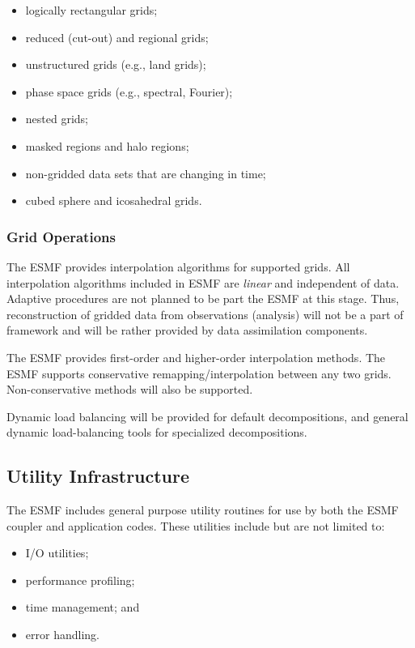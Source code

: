 \begin{itemize}
\item logically rectangular grids;
\item reduced (cut-out) and regional grids;
\item unstructured grids (e.g., land grids);
\item phase space grids (e.g., spectral, Fourier);
\item nested grids;
\item masked regions and halo regions;
\item non-gridded data sets that are changing in time;
\item cubed sphere and icosahedral grids.
\end{itemize}

\subsubsection{Grid Operations}

The ESMF provides interpolation algorithms for supported grids.
All interpolation algorithms included in ESMF are {\it linear} 
and independent of data. Adaptive procedures are not planned to be 
part the ESMF at this stage. Thus, reconstruction of gridded data from 
observations (analysis) will not be a part of framework and will be 
rather provided by data assimilation components.

The ESMF provides first-order and higher-order interpolation 
methods.  The ESMF supports conservative remapping/interpolation 
between any two grids. Non-conservative methods will also 
be supported.

Dynamic load balancing will be provided for default decompositions, 
and general dynamic load-balancing tools for specialized decompositions.

\subsection{Utility Infrastructure}

The ESMF includes general purpose utility routines for use by both 
the ESMF coupler and application codes.  These utilities include 
but are not limited to:
\begin{itemize}
\item I/O utilities;
\item performance profiling;
\item time management; and
\item error handling.
\end{itemize}

